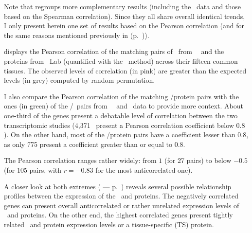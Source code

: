 Note that  regroups more complementary results
(including the \gtex\ data and those based on the Spearman correlation).
Since they all share overall identical trends,
I only present herein one set of results based on the Pearson correlation
(and for the same reasons mentioned previously in 
(p.~\pageref{seg:pearOverSpear})).

 displays the Pearson correlation
of the matching pairs of \mRNAs\ from \uhlen\ \etal\
and the proteins from \pandey\ Lab (quantified with the \PPKM\ method)
across their fifteen common tissues.
The observed levels of correlation (in pink)  are greater
than the expected levels (in grey) computed by random permutation.

I also compare the Pearson correlation of the matching \mRNAs/protein pairs
with the ones (in green) of the \mRNAs{}/\mRNAs\ pairs
from \uhlen\ \etal\ and \gtex\ data
to provide more context.
About one-third of the genes present a debatable level of correlation
between the two transcriptomic studies
(4,371 \mRNAs\ present a Pearson correlation coefficient below $0.8$).
On the other hand,
most of the \mRNA/protein pairs have a coefficient lesser than $0.8$,
as only 775 present a coefficient greater than or equal to $0.8$.

The Pearson correlation ranges rather widely:
from $1$ (for 27 pairs)
to below $-0.5$ (for 105 pairs,
with $r=-0.83$ for the  most anticorrelated one).\mybr\

A closer look at both extremes ( --- p.~\pageref{fig:caseGene})
reveals several possible relationship profiles
between the expression of the \mRNAs\ and proteins.
The negatively correlated genes can present
overall anticorrelated or rather unrelated expression levels
of \mRNAs\ and proteins.
On the other end,
the highest correlated genes present
tightly related \mRNA\ and protein expression levels
or a tissue-specific (\gls{TS}) protein.

